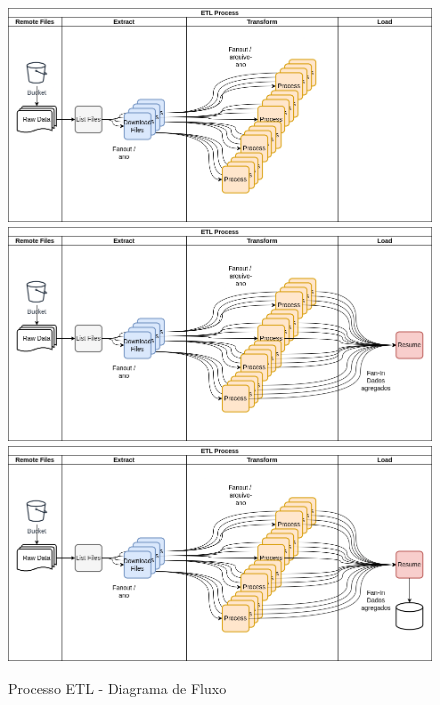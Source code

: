 \documentclass[10pt,brazil]{beamer}
\theoremstyle{definition}
\begin{document}
\begin{frame}[plain]
\begin{figure}
\begin{center}
\begin{overprint}
        \includegraphics[width=1\textwidth]{flow-5.png}
        \includegraphics[width=1\textwidth]{flow-6.png}
        \includegraphics[width=1\textwidth]{flow-7.png}
      \end{overprint}
    \end{center}  
      \caption{Processo ETL - Diagrama de Fluxo}
  \end{figure}  
\end{frame}
\end{document}
